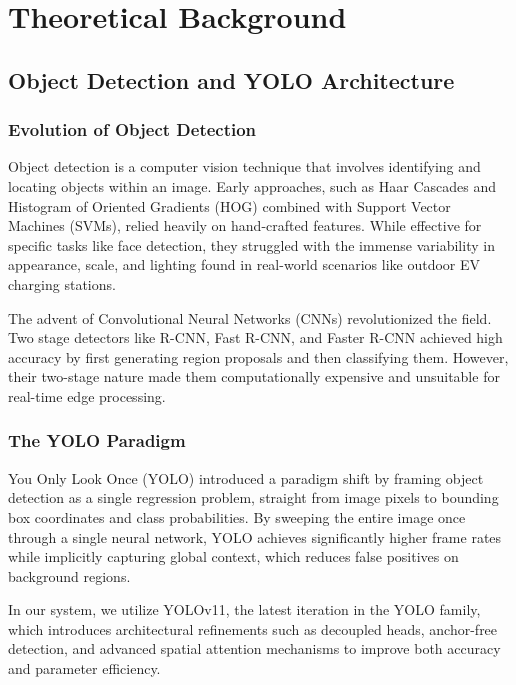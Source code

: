 \chapter{Theoretical Background}
\section{Object Detection and YOLO Architecture}

\subsection{Evolution of Object Detection}
Object detection is a computer vision technique that involves identifying and locating objects within an image. Early approaches, such as Haar Cascades and Histogram of Oriented Gradients (HOG) combined with Support Vector Machines (SVMs), relied heavily on hand-crafted features. While effective for specific tasks like face detection, they struggled with the immense variability in appearance, scale, and lighting found in real-world scenarios like outdoor EV charging stations.

The advent of Convolutional Neural Networks (CNNs) revolutionized the field. Two stage detectors like R-CNN, Fast R-CNN, and Faster R-CNN achieved high accuracy by first generating region proposals and then classifying them. However, their two-stage nature made them computationally expensive and unsuitable for real-time edge processing.

\subsection{The YOLO Paradigm}
You Only Look Once (YOLO) introduced a paradigm shift by framing object detection as a single regression problem, straight from image pixels to bounding box coordinates and class probabilities. By sweeping the entire image once through a single neural network, YOLO achieves significantly higher frame rates while implicitly capturing global context, which reduces false positives on background regions.

In our system, we utilize YOLOv11, the latest iteration in the YOLO family, which introduces architectural refinements such as decoupled heads, anchor-free detection, and advanced spatial attention mechanisms to improve both accuracy and parameter efficiency.

